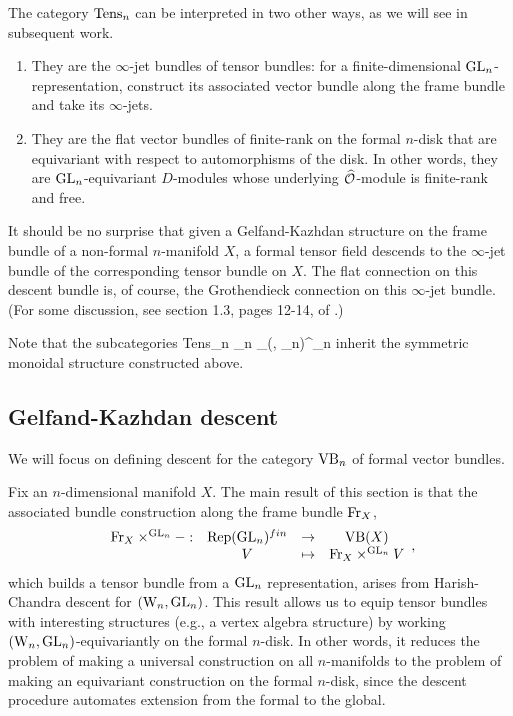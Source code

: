 The category ${\rm Tens}_n$ can be interpreted in two other ways, as we will see in subsequent work.
\begin{enumerate}
\item They are the $\infty$-jet bundles of tensor bundles: for a finite-dimensional ${\rm GL}_n$-representation, 
construct its associated vector bundle along the frame bundle and take its $\infty$-jets.
\item They are the flat vector bundles of finite-rank on the formal $n$-disk that are equivariant with respect to automorphisms of the disk. 
In other words, they are ${\rm GL}_n$-equivariant $D$-modules whose underlying $\widehat{\mathcal O}$-module is finite-rank and free.
\end{enumerate}
It should be no surprise that given a Gelfand-Kazhdan structure on the frame bundle of a non-formal $n$-manifold $X$, 
a formal tensor field descends to the $\infty$-jet bundle of the corresponding tensor bundle on $X$. 
The flat connection on this descent bundle is, of course, the Grothendieck connection on this $\infty$-jet bundle. 
(For some discussion, see section 1.3, pages 12-14, of \cite{Fuks}.)

Note that the subcategories 
\ben
{\rm Tens}_n \hookrightarrow \VB_n
\hookrightarrow \Mod_{(\Vect, \GL_n)}^{\cO_n}
\een
inherit the symmetric monoidal structure constructed above. 

\subsection{Gelfand-Kazhdan descent}

We will focus on defining descent for the category ${\rm VB}_n$ of formal vector
bundles. 

Fix an $n$-dimensional manifold $X$.
The main result of this section is that the associated bundle construction along the frame bundle ${\rm Fr}_X$,
\[
\begin{array}{cccc}
{\rm Fr}_X \times^{{\rm GL}_n} - :&  {\rm Rep}({\rm GL}_n)^{fin} & \to &{\rm VB}(X)\\
& V & \mapsto & {\rm Fr}_X \times^{{\rm GL}_n} V
\end{array},
\]
which builds a tensor bundle from a ${\rm GL}_n$ representation, arises from Harish-Chandra descent for $({{\rm W}_n},{\rm GL}_n)$. 
This result allows us to equip tensor bundles with interesting structures (e.g., a vertex algebra structure) by working $({{\rm W}_n},{\rm GL}_n)$-equivariantly on the formal $n$-disk.
In other words, it reduces the problem of making a universal
construction on all $n$-manifolds to the problem of making an
equivariant construction on the formal $n$-disk,
since the descent procedure automates extension from the formal to the global.

